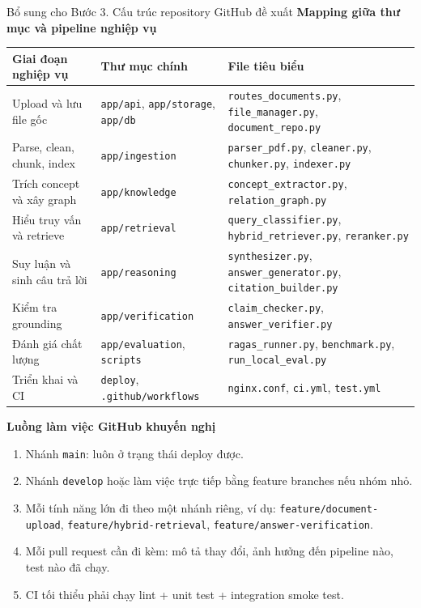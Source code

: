 \documentclass[12pt,a4paper]{article}
\begin{document}
\begin{stepbox}{Bổ sung cho Bước 3. Cấu trúc repository GitHub đề xuất}
\textbf{Mapping giữa thư mục và pipeline nghiệp vụ}
\begin{longtable}{p{}p{}p{}}
\toprule
\textbf{Giai đoạn nghiệp vụ} & \textbf{Thư mục chính} & \textbf{File tiêu biểu} \\
\midrule
\endhead
Upload và lưu file gốc & \texttt{app/api}, \texttt{app/storage}, \texttt{app/db} & \texttt{routes\_documents.py}, \texttt{file\_manager.py}, \texttt{document\_repo.py} \\
Parse, clean, chunk, index & \texttt{app/ingestion} & \texttt{parser\_pdf.py}, \texttt{cleaner.py}, \texttt{chunker.py}, \texttt{indexer.py} \\
Trích concept và xây graph & \texttt{app/knowledge} & \texttt{concept\_extractor.py}, \texttt{relation\_graph.py} \\
Hiểu truy vấn và retrieve & \texttt{app/retrieval} & \texttt{query\_classifier.py}, \texttt{hybrid\_retriever.py}, \texttt{reranker.py} \\
Suy luận và sinh câu trả lời & \texttt{app/reasoning} & \texttt{synthesizer.py}, \texttt{answer\_generator.py}, \texttt{citation\_builder.py} \\
Kiểm tra grounding & \texttt{app/verification} & \texttt{claim\_checker.py}, \texttt{answer\_verifier.py} \\
Đánh giá chất lượng & \texttt{app/evaluation}, \texttt{scripts} & \texttt{ragas\_runner.py}, \texttt{benchmark.py}, \texttt{run\_local\_eval.py} \\
Triển khai và CI & \texttt{deploy}, \texttt{.github/workflows} & \texttt{nginx.conf}, \texttt{ci.yml}, \texttt{test.yml} \\
\bottomrule
\end{longtable}

\textbf{Luồng làm việc GitHub khuyến nghị}
\begin{enumerate}[label=\arabic*.]
    \item Nhánh \texttt{main}: luôn ở trạng thái deploy được.
    \item Nhánh \texttt{develop} hoặc làm việc trực tiếp bằng feature branches nếu nhóm nhỏ.
    \item Mỗi tính năng lớn đi theo một nhánh riêng, ví dụ:\newline
    \texttt{feature/document-upload}, \texttt{feature/hybrid-retrieval}, \texttt{feature/answer-verification}.
    \item Mỗi pull request cần đi kèm:\newline
    mô tả thay đổi, ảnh hưởng đến pipeline nào, test nào đã chạy.
    \item CI tối thiểu phải chạy lint + unit test + integration smoke test.
\end{enumerate}


\end{stepbox}
\end{document}
